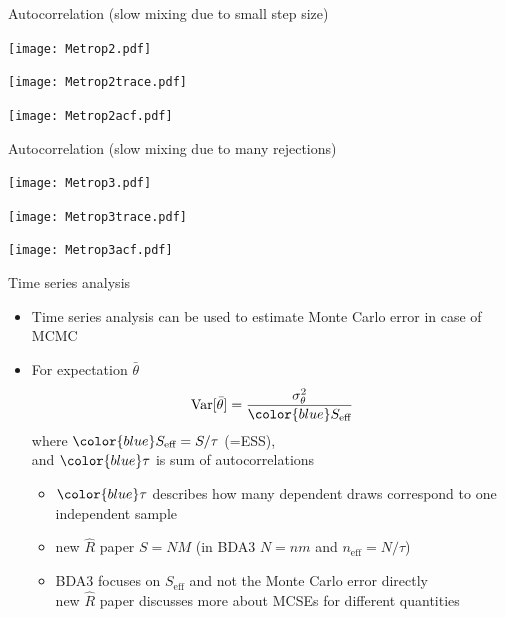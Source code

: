 \documentclass[finnish,english,t]{beamer}
\def\eff{\text{eff}}
\DeclareMathOperator{\Var}{Var}
\begin{document}
\begin{frame}{Autocorrelation {\large (slow mixing due to small step size)}}

  \vspace{-1.2\baselineskip}
  \hspace{-5mm}\begin{minipage}[t][][b]{4.5cm}
  \texttt{[image: Metrop2.pdf]}
  \end{minipage}
  \begin{minipage}[t][][b]{5cm}
    \texttt{[image: Metrop2trace.pdf]}
  \end{minipage}
  \vspace{-\baselineskip}
  \texttt{[image: Metrop2acf.pdf]}
  
\end{frame}

\begin{frame}{Autocorrelation {\large (slow mixing due to many rejections)}}

  \vspace{-1.2\baselineskip}
  \hspace{-5mm}\begin{minipage}[t][][b]{4.5cm}
    \texttt{[image: Metrop3.pdf]}
  \end{minipage}
  \begin{minipage}[t][][b]{5cm}
    \texttt{[image: Metrop3trace.pdf]}
  \end{minipage}
  \vspace{-\baselineskip}
  \texttt{[image: Metrop3acf.pdf]}
  
\end{frame}

\begin{frame}{Time series analysis}

  \begin{itemize}
  \item Time series analysis can be used to estimate Monte Carlo
    error in case of MCMC
  \item For expectation $\bar{\theta}$
    \begin{equation*}
      \Var[\bar{\theta}] = \frac{\sigma^2_\theta}{\color{blue}S_\eff}
    \end{equation*}
    where ${\color{blue}S_\eff=S/\tau}$ (=ESS),\\ and ${\color{blue}\tau}$ is sum of autocorrelations
    \begin{itemize}
      \item<2-> ${\color{blue}\tau}$ describes how many dependent draws correspond to one independent sample
      \item<3-> new $\widehat{R}$ paper $S=NM$ (in BDA3 $N=nm$ and $n_\eff=N/\tau$)
      \item<4-> BDA3 focuses on $S_\eff$ and not the Monte Carlo error directly\\
        new $\widehat{R}$ paper discusses more about MCSEs for different quantities
    \end{itemize}
  \end{itemize}  
\end{frame}
\end{document}
